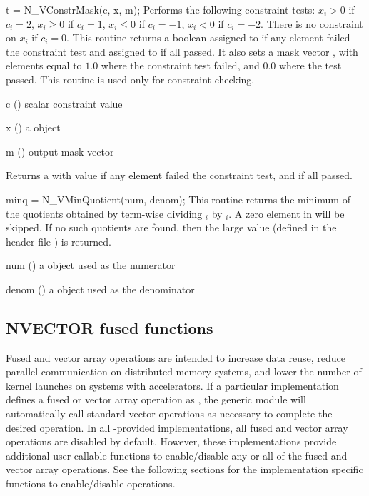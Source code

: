 {
  t = N\_VConstrMask(c, x, m);
}
{
  Performs the following constraint tests:
  $x_i > 0$ if $c_i=2$,
  $x_i \ge 0$ if $c_i=1$,
  $x_i \le 0$ if $c_i=-1$,
  $x_i < 0$ if $c_i=-2$.
  There is no constraint on $x_i$ if $c_i=0$. This routine returns a boolean
  assigned to  if any element failed the constraint test and
  assigned to  if all passed.  It also sets a mask vector ,
  with elements equal to $1.0$ where the constraint test failed, and $0.0$
  where the test passed. This routine is used only for constraint checking.
}
{
  \begin{args}[c]
  \item[c] () scalar constraint value
  \item[x] () a {\nvector} object
  \item[m] () output mask vector
  \end{args}
}
{
  Returns a  with value  if any element failed the
  constraint test, and  if all passed.
}
{}

{
  minq = N\_VMinQuotient(num, denom);
}
{
  This routine returns the minimum of the quotients obtained
  by term-wise dividing $_i$ by $_i$.
  A zero element in  will be skipped.
  If no such quotients are found, then the large value
   (defined in the header file )
  is returned.
}
{
  \begin{args}[x]
  \item[num] () a {\nvector} object used as the numerator
  \item[denom] () a {\nvector} object used as the denominator
  \end{args}
}
{
}
{}


\subsection{NVECTOR fused functions}\label{ss:nvecfusedops}

Fused and vector array operations are intended to increase data reuse, reduce
parallel communication on distributed memory systems, and lower the number of
kernel launches on systems with accelerators. If a particular {\nvector}
implementation defines a fused or vector array operation as , the
generic {\nvector} module will automatically call standard vector operations as
necessary to complete the desired operation.  In all
{\sundials}-provided {\nvector} implementations, all fused and vector
array operations are disabled by default.  However, these
implementations provide additional user-callable functions to enable/disable
any or all of the fused and vector array operations. See the following sections
for the implementation specific functions to enable/disable operations.


